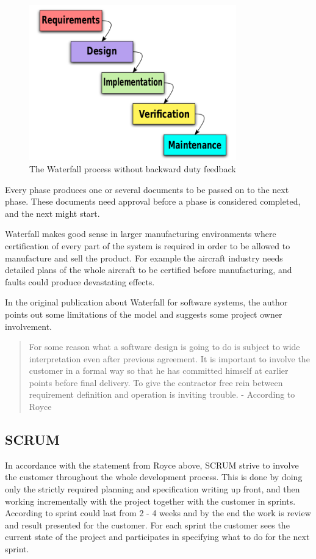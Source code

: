 \documentclass[11pt]{book}
\begin{document}
\begin{figure}[H]
      \centering
      \includegraphics[width=0.8\textwidth]{Figures/Prestudy/Waterfall.png}
      \caption{The Waterfall process \cite{wikipedia:waterfall} without backward duty feedback}
      \label{fig:pre_waterfall}
\end{figure}

Every phase produces one or several documents to be passed on to the next phase. These documents need approval before a phase is considered completed, and the next might start.

Waterfall makes good sense in larger manufacturing environments where certification of every part of the system is required in order to be allowed to manufacture and sell the product. For example the aircraft industry needs detailed plans of the whole aircraft to be certified before manufacturing, and faults could produce devastating effects.

In the original publication about Waterfall for software systems, the author points out some limitations of the model and suggests some project owner involvement.

\begin{quotation}\noindent
For some reason what a software design is going to do is subject to wide interpretation even after previous agreement. It is important to involve the customer in a formal way so that he has committed himself at earlier points before final delivery. To give the contractor free rein between requirement definition and operation is inviting trouble. - According to Royce \cite[p. 335]{DBLP:conf/icse/Royce87}
\end{quotation}

\subsection{SCRUM}
In accordance with the statement from Royce above, SCRUM strive to involve the customer throughout the whole development process. This is done by doing only the strictly required planning and specification writing up front, and then working incrementally with the project together with the customer in sprints. According to \cite[p. 73]{Sommerville10} sprint could last from 2 - 4 weeks and by the end the work is review and result presented for the customer. For each sprint the customer sees the current state of the project and participates in specifying what to do for the next sprint.
\end{document}
